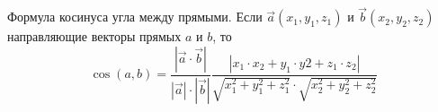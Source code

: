 \documentclass[preview]{standalone}
\begin{document}
\begin{center}
Формула косинуса угла между прямыми. Если $\vec{a}(x_1, y_1, z_1)$ и $\vec{b}(x_2, y_2, z_2)$ направляющие векторы прямых $a$ и $b$, то$$\cos(a,b) = \frac{|\vec{a} \cdot \vec{b}|}{|\vec{a}|\cdot|\vec{b}|}\frac{|x_1 \cdot x_2 + y_1 \cdot y2 + z_1 \cdot z_2|}{\sqrt{x_1^2 + y_1^2 + z_1^2} \cdot \sqrt{x_2^2 + y_2^2 + z_2^2}}$$
\end{center}
\end{document}
